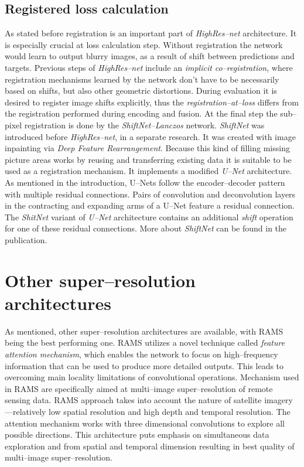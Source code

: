 \subsection{Registered loss calculation}
As stated before registration is an important part of \textit{HighRes--net} architecture.
It is especially crucial at loss calculation step.
Without registration the network would learn to output blurry images, as a result of shift between predictions and targets.
Previous steps of \textit{HighRes--net} include an \textit{implicit co--registration}, where registration mechanisms learned by the network don't have to be necessarily based on shifts, but also other geometric distortions.
During evaluation it is desired to register image shifts explicitly, thus the \textit{registration--at--loss} differs from the registration performed during encoding and fusion.
At the final step the sub--pixel registration is done by the \textit{ShiftNet--Lanczos} network.
\textit{ShiftNet} \cite{zhaoyi-2018-shiftnet} was introduced before \textit{HighRes--net}, in a separate research.
It was created with image inpainting via \textit{Deep Feature Rearrangement}.
Because this kind of filling missing picture areas works by reusing and transferring existing data it is suitable to be used as a registration mechanism.
It implements a modified \textit{U--Net} \cite{ronnenberger-2015-unet} architecture.
As mentioned in the introduction, U--Nets follow the encoder--decoder pattern with multiple residual connections.
Pairs of convolution and deconvolution layers in the contracting and expanding arms of a U--Net feature a residual connection.
The \textit{ShitNet} variant of \textit{U--Net} architecture contains an additional \textit{shift} operation for one of these residual connections.
More about \textit{ShiftNet} can be found in the publication.

\section{Other super--resolution architectures}
As mentioned, other super--resolution architectures are available, with RAMS \cite{salvetti-2020-rams} being the best performing one.
RAMS utilizes a novel technique called \textit{feature attention mechanism}, which enables the network to focus on high--frequency information that can be used to produce more detailed outputs.
This leads to overcoming main locality limitations of convolutional operations.
Mechanism used in RAMS are specifically aimed at multi--image super--resolution of remote sensing data.
RAMS approach takes into account the nature of satellite imagery---relatively low spatial resolution and high depth and temporal resolution.
The attention mechanism works with three dimensional convolutions to explore all possible directions.
This architecture puts emphasis on simultaneous data exploration and from spatial and temporal dimension resulting in best quality of multi--image super--resolution.